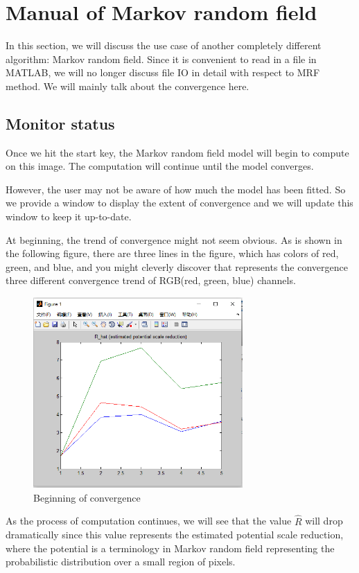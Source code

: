 \newpage
\section{Manual of Markov random field}
In this section, we will discuss the use case of another completely different algorithm: Markov random field. Since it is convenient to read in a file in MATLAB, we will no longer discuss file IO in detail with respect to MRF method. We will mainly talk about the convergence here.
\subsection{Monitor status}
Once we hit the start key, the Markov random field model will begin to compute on this image. The computation will continue until the model converges.

However, the user may not be aware of how much the model has been fitted. So we provide a window to display the extent of convergence and we will update this window to keep it up-to-date.

At beginning, the trend of convergence might not seem obvious. As is shown in the following figure, there are three lines in the figure, which has colors of red, green, and blue, and you might cleverly discover that represents the convergence three different convergence trend of RGB(red, green, blue) channels.

\begin{figure}[H]
\centering
\includegraphics[width=8cm]{mrf_beg.png}
\caption{Beginning of convergence}
\end{figure}

As the process of computation continues, we will see that the value $\hat{R}$ will drop dramatically since this value represents the estimated potential scale reduction, where the potential is a terminology in Markov random field representing the probabilistic distribution over a small region of pixels.


